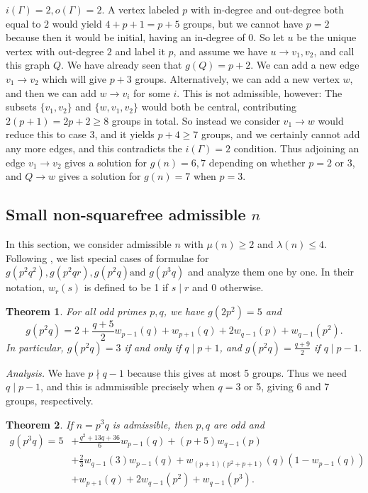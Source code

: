 \documentclass{article}
\theoremstyle{plain}
\newtheorem{fact}{Theorem}[section]
\theoremstyle{definition}
\begin{document}
 $i(\Gamma) = 2, o(\Gamma) = 2$. A vertex labeled $p$ with in-degree and out-degree both equal to $2$ would yield $4 + p + 1 = p + 5$ groups, but we cannot have $p = 2$ because then it would be initial, having an in-degree of $0$. So let $u$ be the unique vertex with out-degree $2$ and label it $p$, and assume we have $u \rightarrow v_1, v_2$, and call this graph $Q$. We have already seen that $g(Q) = p + 2$.
We can add a new edge $v_1 \rightarrow v_2$ which will give $p + 3$ groups. Alternatively, we can add a new vertex $w$, and then we can add $w \rightarrow v_i$ for some $i$. This is not admissible, however: The subsets $\{v_1, v_2\}$ and $\{w, v_1, v_2\}$ would both be central, contributing $2(p + 1) = 2p + 2 \ge 8$ groups in total. So instead we consider $v_1 \rightarrow w$ would reduce this to case 3, and it yields $p + 4 \ge 7$ groups, and we certainly cannot add any more edges, and this contradicts the $i(\Gamma) = 2$ condition. Thus adjoining an edge $v_1 \rightarrow v_2$ gives a solution for $g(n) = 6, 7$ depending on whether $p = 2$ or $3$, and $Q \rightarrow w$ gives a solution for $g(n) = 7$ when $p = 3$. 

\subsection{Small non-squarefree admissible $n$}
In this section, we consider admissible $n$ with $\mu(n) \ge 2$ and $\lambda(n) \le 4$. Following {\cite{bettinafour1}}, we list special cases of formulae for $g(p^2 q^2), g(p^2 q r), g(p^2 q) \text{and } g(p^3 q)$ and analyze them one by one. In their notation, $w_r(s)$ is defined to be 1 if $s \mid r$ and 0 otherwise. 

\begin{fact}
	For all odd primes $p, q$, we have $g(2p^2) = 5$ and \[g(p^2 q) = 2 + \frac{q + 5}{2} w_{p - 1}(q) + w_{p + 1}(q) + 2w_{q - 1}(p) + w_{q - 1}(p^2).\] In particular, $g(p^2 q) = 3$ if and only if $q \mid p + 1$, and $g(p^2 q) = \frac{q + 9}{2}$ if $q \mid p - 1$.
\end{fact}

\textit{Analysis.} We have $p \nmid q - 1$ because this gives at most 5 groups. Thus we need $q \mid p - 1$, and this is admmissible precisely when $q = 3$ or 5, giving 6 and 7 groups, respectively.

\begin{fact}
	If $n = p^3 q$ is admissible, then $p, q$ are odd and
	$$\begin{aligned}
		g(p^3 q) = 5 &+ \frac{q^2 + 13q + 36}{6} w_{p - 1}(q) + (p + 5) w_{q - 1}(p) \\
		&+ \frac{2}{3} w_{q - 1}(3)w_{p - 1}(q) + w_{(p + 1)(p^2 + p + 1)}(q) (1 - w_{p - 1}(q)) \\
		&+ w_{p + 1}(q) + 2 w_{q - 1}(p^2) + w_{q - 1}(p^3).
	\end{aligned}$$
\end{fact}
\end{document}
